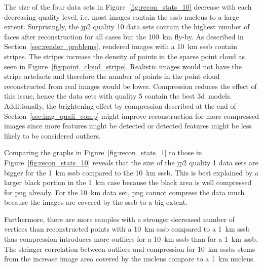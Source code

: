 The size of the four data sets in Figure~\ref{fig:recon_stats_10} decrease with each decreasing quality level, i.e. most images contain the \gls{sssb} nucleus to a large extent. Surprisingly, the \gls{jp2} quality 10 data sets contain the highest number of faces after reconstruction for all cases but the \SI{100}{\kilo\meter} fly-by. As described in Section~\ref{sec:render_problems}, rendered images with a \SI{10}{\kilo\meter} \gls{sssb} contain stripes. The stripes increase the density of points in the sparse point cloud as seen in Figure~\ref{fig:point_cloud_stripe}. Realistic images would not have the stripe artefacts and therefore the number of points in the point cloud reconstructed from real images would be lower. Compression reduces the effect of this issue, hence the data sets with quality 5 contain the best \gls{3d}~models. Additionally, the brightening effect by compression described at the end of Section~\ref{sec:img_quali_comp} might improve reconstruction for more compressed images since more features might be detected or detected features might be less likely to be considered outliers.

Comparing the graphs in Figure~\ref{fig:recon_stats_1} to those in Figure~\ref{fig:recon_stats_10} reveals that the size of the \gls{jp2} quality 1 data sets are bigger for the \SI{1}{\kilo\meter} \gls{sssb} compared to the \SI{10}{\kilo\meter} \gls{sssb}. This is best explained by a larger black portion in the \SI{1}{\kilo\meter} case because the black area is well compressed for \gls{png} already. For the \SI{10}{\kilo\meter} data set, \gls{png} cannot compress the data much because the images are covered by the \gls{sssb} to a big extent.

Furthermore, there are more samples with a stronger decreased number of vertices than reconstructed points with a \SI{10}{\kilo\meter} \gls{sssb} compared to a \SI{1}{\kilo\meter} \gls{sssb} thus compression introduces more outliers for a \SI{10}{\kilo\meter} \gls{sssb} than for a \SI{1}{\kilo\meter} \gls{sssb}. The stringer correlation between outliers and compression for \SI{10}{\kilo\meter} \glspl{sssb} stems from the increase image area covered by the nucleus compare to a \SI{1}{\kilo\meter} nucleus.

